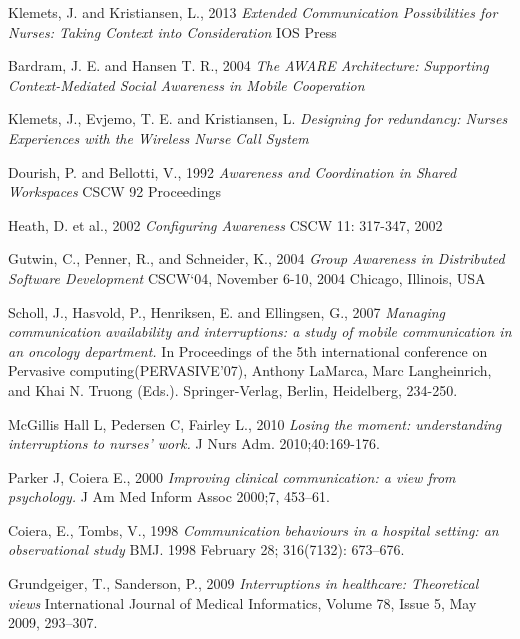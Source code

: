 \documentclass[b5paper, 11pt, norsk]{MScthesisITEM}
\begin{document}
\begin{thebibliography}{99}

Klemets, J. and Kristiansen, L., 2013
\emph{Extended Communication Possibilities for Nurses: Taking Context into Consideration}
IOS Press
  

Bardram, J. E. and Hansen T. R., 2004
\emph{The AWARE Architecture: Supporting Context-Mediated Social Awareness in Mobile Cooperation}

Klemets, J., Evjemo, T. E. and Kristiansen, L.
\emph{Designing for redundancy: Nurses Experiences with the Wireless Nurse Call System}

Dourish, P. and Bellotti, V., 1992
\emph{Awareness and Coordination in Shared Workspaces}
CSCW 92 Proceedings

Heath, D. et al., 2002
\emph{Configuring Awareness}
CSCW 11: 317-347, 2002

Gutwin, C., Penner, R., and Schneider, K., 2004
\emph{Group Awareness in Distributed Software Development}
CSCW`04, November 6-10, 2004 Chicago, Illinois, USA

Scholl, J., Hasvold, P., Henriksen, E. and Ellingsen, G., 2007
\emph {Managing communication availability and interruptions: a study of mobile communication in an oncology department.} 
In Proceedings of the 5th international conference on Pervasive computing(PERVASIVE'07), Anthony LaMarca, Marc Langheinrich, and Khai N. Truong (Eds.). Springer-Verlag, Berlin, Heidelberg, 234-250.

McGillis Hall L, Pedersen C, Fairley L., 2010
\emph {Losing the moment: understanding interruptions to nurses' work.}
J Nurs Adm. 2010;40:169-176.

Parker J, Coiera E., 2000
\emph {Improving clinical communication: a view from psychology.} 
J Am Med Inform Assoc 2000;7, 453–61.

Coiera, E., Tombs, V., 1998
\emph{Communication behaviours in a hospital setting: an observational study}
BMJ. 1998 February 28; 316(7132): 673–676.

Grundgeiger, T., Sanderson, P., 2009
\emph {Interruptions in healthcare: Theoretical views}
International Journal of Medical Informatics, Volume 78, Issue 5, May 2009, 293–307.


\end{thebibliography}
\end{document}
